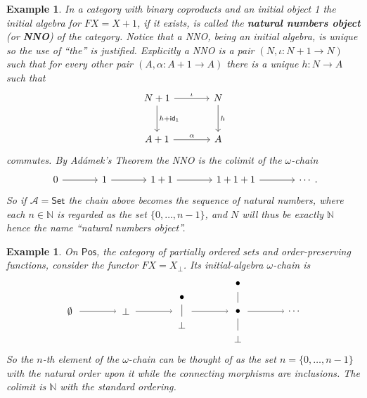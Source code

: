 \documentclass[letterpaper, 11pt, oneside]{memoir}
\theoremstyle{myteo}
\newtheorem{example}[theorem]{Example}
\numberwithin{equation}{section}
\newcommand{\marginnote}[1]{\marginpar{\footnotesize #1}}
\newcommand{\id}{\textsf{id}}
\newcommand{\Set}{\textsf{Set}}
\newcommand{\Pos}{\textsf{Pos}}
\newcommand{\N}{\mathbb{N}}
\newcommand{\A}{\mathscr{A}}
\begin{document}
\begin{example}
  In a category with binary coproducts and an initial object 1 the initial algebra for \(FX = X + 1\), if it exists, is called the \textbf{natural numbers object} (or \textbf{NNO}) \marginnote{natural numbers object} of the category.
  Notice that a NNO, being an initial algebra, is unique so the use of ``the'' is justified.
  Explicitly a NNO is a pair \((N, \iota:N+1 \to N)\) such that for every other pair \((A, \alpha : A+1 \to A)\) there is a unique \(h:N\to A\) such that
  \begin{equation*}
    \begin{tikzcd}[sep = large]
      N + 1 \ar[r, "\iota"] \ar[d, "h + \id_1"] & N \ar[d, "h"]\\
      A + 1 \ar[r, "\alpha"] & A
    \end{tikzcd}
  \end{equation*}
  commutes.
  By Adámek's Theorem the NNO is the colimit of the \(\omega\)-chain
  \begin{equation*}
    \begin{tikzcd}[sep = large]
      0 \ar[r] & 1 \ar[r] & 1 + 1 \ar[r] & 1 + 1 + 1 \ar[r] & \cdots
    \end{tikzcd}.
  \end{equation*}
  So if \(\A = \Set\) the chain above becomes the sequence of natural numbers, where each \(n \in \N\) is regarded as the set \(\{0, \ldots, n-1\}\), and \(N\) will thus be exactly \(\N\) hence the name ``natural numbers object''. 
\end{example}

\begin{example}
  On \(\Pos\), the category of partially ordered sets and order-preserving functions, consider the functor \(FX = X_\bot\).
  Its initial-algebra \(\omega\)-chain is
  \begin{equation*}
    \begin{tikzpicture}[every node/.style={outer sep=0.5cm}]
      \node (1) at (0, 0){\(\emptyset\)};
      \node (2) at (2, 0){\(\bot\)};
      \node (3) at (4, 0.5){\(\bullet\)};
      \node (4) at (4, -0.5){\(\bot\)};
      \node (5) at (6, 1){\(\bullet\)};
      \node (6) at (6, 0){\(\bullet\)};
      \node (7) at (6, -1){\(\bot\)};
      \node (8) at (8, 0){\(\cdots\)};
      \node (9) at (4, 0){};

      \draw[-] (3) -- (4);
      \draw[-] (5) -- (6) -- (7);

      \draw[->] (0.35, 0) to (1.65, 0);
      \draw[->] (2.35, 0) to (3.65, 0);
      \draw[->] (4.35, 0) to (5.65, 0);
      \draw[->] (6.35, 0) to (7.65, 0);
      
    \end{tikzpicture}
  \end{equation*}
  So the \(n\)-th element of the \(\omega\)-chain can be thought of as the set \(n = \{0, \ldots, n-1\}\) with the natural order upon it while the connecting morphisms are inclusions.
  The colimit is \(\N\) with the standard ordering.
\end{example}
\end{document}
